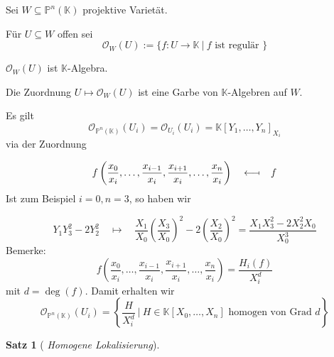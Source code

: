 \documentclass[11pt]{book}
\newtheorem{theorem}{Satz}[section]
\theoremstyle{nonumberbreak}
\newenvironment{ex}[1][]{\ifthenelse{\equal{#1}{}}{\example}{\example[#1]}\rm}{\endexample}
\newenvironment{definbem}[1][]{\ifthenelse{\equal{#1}{}}{\definibem}{\definibem[#1]}\rm}{\enddefinibem}
\begin{document}
\begin{spacing}{1.3}
\begin{definbem}  %

Sei $W \subseteq \mathbb{P}^n(\mathbb{K})$ projektive Varietät.
\begin{compactenum}
\item Für $U \subseteq W$ offen sei 
$$\mathcal{O}_W(U) := \{f: U \longrightarrow \mathbb{K} \ \vert \ f \textrm{ ist regulär } \}$$
\item $\mathcal{O}_W(U)$ ist $\mathbb{K}$-Algebra.
\item Die Zuordnung
$U \mapsto \mathcal{O}_W(U)$
ist eine Garbe von $\mathbb{K}$-Algebren auf $W$.
\end{compactenum}
\end{definbem}

\begin{ex}
Es gilt
$$\mathcal{O}_{\mathbb{P}^n(\mathbb{K})}(U_i) = \mathcal{O}_{U_i}(U_i) = \mathbb{K}[Y_1, \ldots, Y_n]_{X_i}$$
via der Zuordnung

$$f\left( \frac{x_0}{x_i}, \ldots, \frac{x_{i-1}}{x_i}, \frac{x_{i+1}}{x_i}, \ldots, \frac{x_n}{x_i} \right)\quad  \longleftarrow\joinrel\mapstochar \quad f$$
Ist zum Beispiel $i=0, n=3$, so haben wir

$$Y_1 Y_3^2 - 2 Y_2^2 \quad \longmapsto \quad \frac{X_1}{X_0} \left( \frac{X_3}{X_0}\right)^2 - 2 \left( \frac{X_2}{X_0}\right)^2 = \frac{X_1X_3^2 - 2 X_2^2 X_0 }{X_0^3}$$
Bemerke:
$$f\left( \frac{x_0}{x_i}, \ldots, \frac{x_{i-1}}{x_i}, \frac{x_{i+1}}{x_i}, \ldots, \frac{x_n}{x_i} \right) = \frac{H_i(f)}{X_i^d}$$
mit $d = \deg(f)$. Damit erhalten wir
$$\mathcal{O}_{\mathbb{P}^n(\mathbb{K})}(U_i) = \left\{ \frac{H}{X_i^d} \ \bigg \vert  \ H \in \mathbb{K}[X_0, \ldots, X_n] \textrm{ homogen von Grad }d \right\}$$
\end{ex}

\begin{theorem}[ \rm \it Homogene Lokalisierung]


\end{theorem}
\end{spacing}
\end{document}
